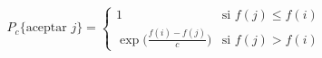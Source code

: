 \documentclass[letterpaper,12pt]{article}
\begin{document}
\pagestyle{empty}
\thispagestyle{empty}

\noindent

\begin{equation}
P_c\{\text{aceptar } j\} =
 \begin{cases}
   1 & \text{si $f(j) \le f(i)$} \\
   \exp\bigg({\frac{f(i)-f(j)}{c}}\bigg) & \text{si $f(j) > f(i)$}
 \end{cases}
\end{equation}
	    
\end{document}
